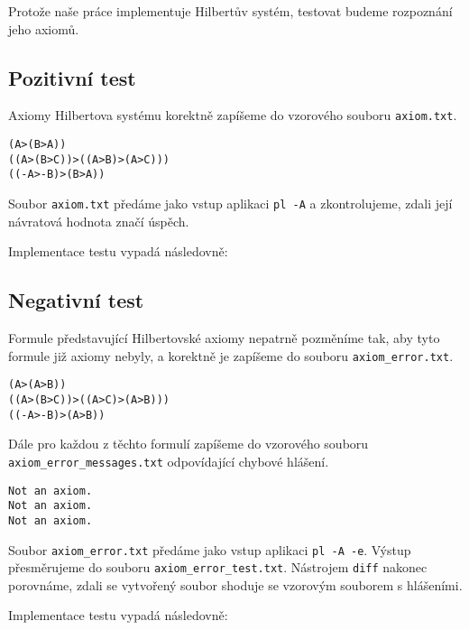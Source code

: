 \documentclass[thesis=B,czech,hidelinks]{FITthesis}[2012/06/26]
\begin{document}
Protože naše práce implementuje Hilbertův systém, testovat budeme rozpoznání jeho axiomů.

\subsection{Pozitivní test}

Axiomy Hilbertova systému korektně zapíšeme do vzorového souboru \texttt{axiom.txt}.

\begin{verbatim}
(A>(B>A))
((A>(B>C))>((A>B)>(A>C)))
((-A>-B)>(B>A))
\end{verbatim}

Soubor \texttt{axiom.txt} předáme jako vstup aplikaci \texttt{pl -A} a zkontrolujeme, zdali její návratová hodnota značí úspěch.

Implementace testu vypadá následovně:

\begin{center}

\end{center}

\subsection{Negativní test}

Formule představující Hilbertovské axiomy nepatrně pozměníme tak, aby tyto formule již axiomy nebyly, a korektně je zapíšeme do souboru \texttt{axiom\_error.txt}.

\begin{verbatim}
(A>(A>B))
((A>(B>C))>((A>C)>(A>B)))
((-A>-B)>(A>B))
\end{verbatim}

Dále pro každou z těchto formulí zapíšeme do vzorového souboru \texttt{axiom\_error\_messages.txt} odpovídající chybové hlášení.

\begin{verbatim}
Not an axiom.
Not an axiom.
Not an axiom.
\end{verbatim}

Soubor \texttt{axiom\_error.txt} předáme jako vstup aplikaci \texttt{pl -A -e}. Výstup přesměrujeme do souboru \texttt{axiom\_error\_test.txt}. Nástrojem \texttt{diff} nakonec porovnáme, zdali se vytvořený soubor shoduje se vzorovým souborem s hlášeními.

Implementace testu vypadá následovně:
\end{document}
